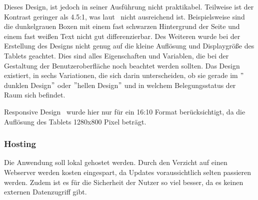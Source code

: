 Dieses Design, ist jedoch in seiner Ausführung nicht praktikabel.
Teilweise ist der Kontrast geringer als 4.5:1, was laut~\cite{WCAG} nicht ausreichend ist.
Beispielsweise sind die dunkelgrauen Boxen mit einem fast schwarzen Hintergrund der Seite und einem fast weißen Text nicht gut differenzierbar.
Des Weiteren wurde bei der Erstellung des Designs nicht genug auf die kleine Auflösung und Displaygröße des Tablets geachtet.
Dies sind alles Eigenschaften und Variablen, die bei der Gestaltung der Benutzeroberfläche noch beachtet werden sollten.
\newline
Das Design existiert, in sechs Variationen, die sich darin unterscheiden, ob sie gerade im \("\)dunklen Design\("\) oder \("\)hellen Design\("\) und in welchem Belegungsstatus der Raum sich befindet.
\newline
{}

\gls{Responsive Design}~\cite{ResponsiveWebDesign} wurde hier nur für ein 16:10 Format berücksichtigt, da die Auflösung des Tablets 1280x800 Pixel beträgt.
\subsubsection{Hosting}\label{subsubsec:hosting}
Die Anwendung soll lokal gehostet werden.
Durch den Verzicht auf einen Webserver werden kosten eingespart, da Updates voraussichtlich selten passieren werden.
Zudem ist es für die Sicherheit der Nutzer so viel besser, da es keinen externen Datenzugriff gibt.
